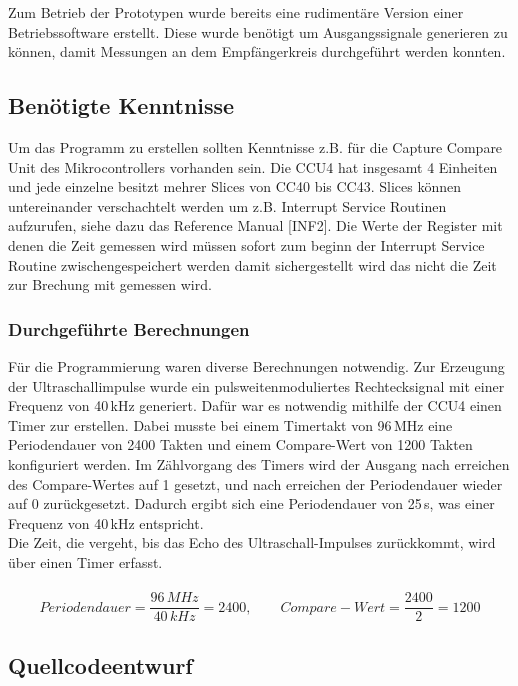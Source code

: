 Zum Betrieb der Prototypen wurde bereits eine rudimentäre Version einer Betriebssoftware erstellt. Diese wurde benötigt um Ausgangssignale generieren zu können, damit Messungen an dem Empfängerkreis durchgeführt werden konnten.
\subsection{Benötigte Kenntnisse}
Um das Programm zu erstellen sollten Kenntnisse z.B. für die Capture Compare Unit des Mikrocontrollers vorhanden sein. Die CCU4 hat insgesamt 4 Einheiten und jede einzelne besitzt mehrer Slices von CC40 bis CC43. Slices können untereinander verschachtelt werden um z.B. Interrupt Service Routinen aufzurufen, siehe dazu das Reference Manual [INF2].
Die Werte der Register mit denen die Zeit gemessen wird müssen sofort zum beginn der Interrupt Service Routine zwischengespeichert werden damit sichergestellt wird das nicht die Zeit zur Brechung mit gemessen wird.\\

\subsubsection{Durchgeführte Berechnungen}
Für die Programmierung waren diverse Berechnungen notwendig. Zur Erzeugung der Ultraschallimpulse wurde ein pulsweitenmoduliertes Rechtecksignal mit einer Frequenz von 40\,kHz generiert. Dafür war es notwendig mithilfe der CCU4 einen Timer zur erstellen. Dabei musste bei einem Timertakt von 96\,MHz eine Periodendauer von 2400 Takten und einem Compare-Wert von 1200 Takten konfiguriert werden. Im Zählvorgang des Timers wird der Ausgang nach erreichen des Compare-Wertes auf 1 gesetzt, und nach erreichen der Periodendauer wieder auf 0 zurückgesetzt. Dadurch ergibt sich eine Periodendauer von 25\,\textmu s, was einer Frequenz von 40\,kHz entspricht.\\
Die Zeit, die vergeht, bis das Echo des Ultraschall-Impulses zurückkommt, wird über einen Timer erfasst. 
\onehalfspacing \\ \\
\[\displaystyle Periodendauer=\frac{96\,MHz}{40\,kHz} = 2400,\qquad	 Compare-Wert=\frac{2400}{2} = 1200 \] 
\singlespacing


\subsection{Quellcodeentwurf}

